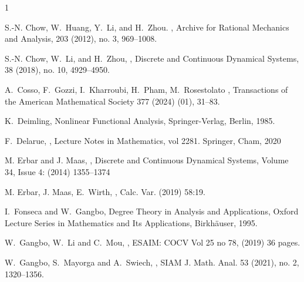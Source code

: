 \documentclass[10pt]{article}
\numberwithin{equation}{section}
\begin{document}
\begin{thebibliography}{1}
{ 
S.-N. Chow, W.~Huang, Y.~Li, and H.~Zhou.
,
\newblock Archive for Rational Mechanics and Analysis, 203 (2012), no. 3, 969--1008.

S.-N. Chow, W.~Li, and H.~Zhou,
,
\newblock Discrete and Continuous Dynamical Systems, 38 (2018), no. 10, 4929--4950.

 A.~Cosso, F.~Gozzi, I.~Kharroubi, H.~Pham, M.~Rosestolato
,
\newblock Transactions of the American Mathematical Society 377 (2024) (01), 31--83.

K.~Deimling,
\newblock Nonlinear Functional Analysis,
\newblock Springer-Verlag, Berlin, 1985.

 F.~Delarue,
,
\newblock Lecture Notes in Mathematics, vol 2281. Springer, Cham, 2020


M. Erbar and J. Maas, 
, 
\newblock  Discrete and Continuous Dynamical Systems, Volume 34, Issue 4: (2014) 1355--1374

 M. Erbar, J. Maas, E.~Wirth, 
, 
\newblock  Calc. Var. (2019) 58:19.









 I.~Fonseca and W.~Gangbo, 
\newblock Degree Theory in Analysis and Applications, 
\newblock Oxford Lecture Series in Mathematics and Its Applications, Birkh\"auser, 1995.  


 W.~Gangbo, W.~Li and C.~Mou, 
,
\newblock  ESAIM: COCV Vol 25 no 78, (2019) 36 pages.

W.~Gangbo, S.~Mayorga and A.~Swiech,
,
\newblock SIAM J. Math. Anal. 53 (2021), no. 2, 1320--1356.   


}
\end{thebibliography}
\end{document}
